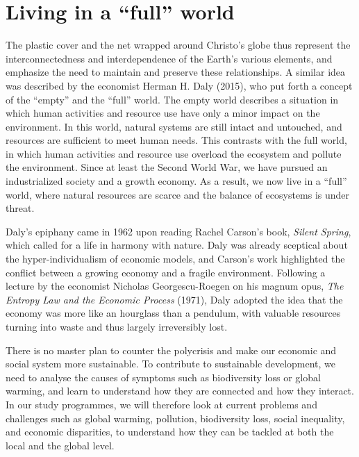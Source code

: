 \documentclass[
  a4paper,
  DIV=11,
  numbers=noendperiod,
  oneside,
  openany]{scrreprt}
\begin{document}
\section*{Living in a ``full'' world}\label{living-in-a-full-world}


The plastic cover and the net wrapped around Christo's globe thus
represent the interconnectedness and interdependence of the Earth's
various elements, and emphasize the need to maintain and preserve these
relationships. A similar idea was described by the economist Herman H.
Daly (2015), who put forth a concept of the ``empty'' and the ``full''
world. The empty world describes a situation in which human activities
and resource use have only a minor impact on the environment. In this
world, natural systems are still intact and untouched, and resources are
sufficient to meet human needs. This contrasts with the full world, in
which human activities and resource use overload the ecosystem and
pollute the environment. Since at least the Second World War, we have
pursued an industrialized society and a growth economy. As a result, we
now live in a ``full'' world, where natural resources are scarce and the
balance of ecosystems is under threat.

Daly's epiphany came in 1962 upon reading Rachel Carson's book,
\emph{Silent Spring}, which called for a life in harmony with nature.
Daly was already sceptical about the hyper-individualism of economic
models, and Carson's work highlighted the conflict between a growing
economy and a fragile environment. Following a lecture by the economist
Nicholas Georgescu-Roegen on his magnum opus, \emph{The Entropy Law and
the Economic Process} (1971), Daly adopted the idea that the economy was
more like an hourglass than a pendulum, with valuable resources turning
into waste and thus largely irreversibly lost.

There is no master plan to counter the polycrisis and make our economic
and social system more sustainable. To contribute to sustainable
development, we need to analyse the causes of symptoms such as
biodiversity loss or global warming, and learn to understand how they
are connected and how they interact. In our study programmes, we will
therefore look at current problems and challenges such as global
warming, pollution, biodiversity loss, social inequality, and economic
disparities, to understand how they can be tackled at both the local and
the global level.
\end{document}
